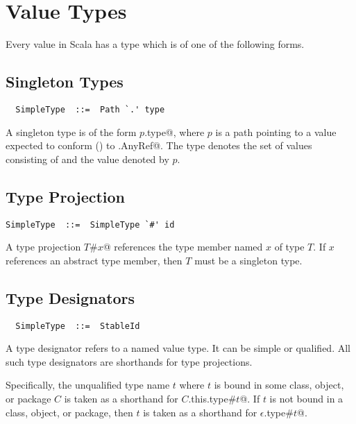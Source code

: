\section{Value Types}\label{sec:value-types}

Every value in Scala has a type which is of one of the following
forms.

\subsection{Singleton Types}
\label{sec:singleton-type}

\syntax\begin{lstlisting}
  SimpleType  ::=  Path `.' type
\end{lstlisting}

A singleton type is of the form \lstinline@$p$.type@, where $p$ is a
path pointing to a value expected to conform ()
to \lstinline@scala.AnyRef@.  The type denotes the set of values
consisting of  and the value denoted by $p$. 

\subsection{Type Projection}
\label{sec:type-project}

\syntax\begin{lstlisting} 
SimpleType  ::=  SimpleType `#' id
\end{lstlisting}

A type projection \lstinline@$T$#$x$@ references the type member named
$x$ of type $T$. If $x$ references an abstract type member, then $T$
must be a singleton type. 

\subsection{Type Designators}
\label{sec:type-desig}

\syntax\begin{lstlisting}
  SimpleType  ::=  StableId
\end{lstlisting}

A type designator refers to a named value type. It can be simple or
qualified. All such type designators are shorthands for type projections.

Specifically, the unqualified type name $t$ where $t$ is bound in some
class, object, or package $C$ is taken as a shorthand for
\lstinline@$C$.this.type#$t$@.  If $t$ is not bound in a class, object, or
package, then $t$ is taken as a shorthand for
\lstinline@$\epsilon$.type#$t$@.

